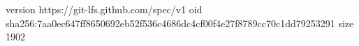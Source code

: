 version https://git-lfs.github.com/spec/v1
oid sha256:7aa0ec647ff8650692eb52f536c4686dc4cf00f4e27f8789cc70c1dd79253291
size 1902
